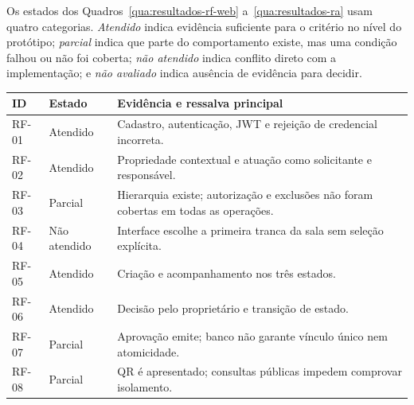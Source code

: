 Os estados dos Quadros~\ref{qua:resultados-rf-web} a~\ref{qua:resultados-ra} usam quatro categorias. \textit{Atendido} indica evidência suficiente para o critério no nível do protótipo; \textit{parcial} indica que parte do comportamento existe, mas uma condição falhou ou não foi coberta; \textit{não atendido} indica conflito direto com a implementação; e \textit{não avaliado} indica ausência de evidência para decidir.

\begin{quadro}[htbp]
    \caption{Resultados de RF-01 a RF-08}
    \label{qua:resultados-rf-web}
    \small
    \begin{tabular}{|p{}|p{}|p{}|}
        \hline
        \textbf{ID} & \textbf{Estado} & \textbf{Evidência e ressalva principal} \\ \hline
        RF-01 & Atendido & Cadastro, autenticação, JWT e rejeição de credencial incorreta. \\ \hline
        RF-02 & Atendido & Propriedade contextual e atuação como solicitante e responsável. \\ \hline
        RF-03 & Parcial & Hierarquia existe; autorização e exclusões não foram cobertas em todas as operações. \\ \hline
        RF-04 & Não atendido & Interface escolhe a primeira tranca da sala sem seleção explícita. \\ \hline
        RF-05 & Atendido & Criação e acompanhamento nos três estados. \\ \hline
        RF-06 & Atendido & Decisão pelo proprietário e transição de estado. \\ \hline
        RF-07 & Parcial & Aprovação emite; banco não garante vínculo único nem atomicidade. \\ \hline
        RF-08 & Parcial & QR é apresentado; consultas públicas impedem comprovar isolamento. \\ \hline
    \end{tabular}
\end{quadro}

